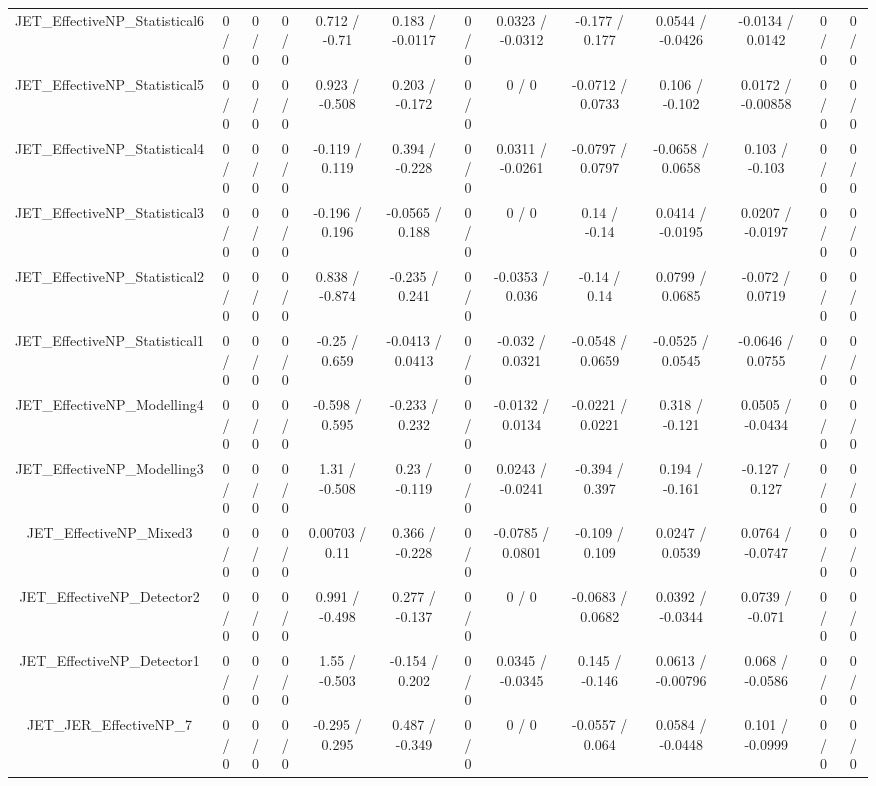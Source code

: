 \documentclass[10pt]{article}
\begin{document}
\begin{table}[htbp]
\begin{center}
\begin{tabular}{|c|c|c|c|c|c|c|c|c|c|c|c|c|}
  JET_EffectiveNP_Statistical6 & 0 / 0 & 0 / 0 & 0 / 0 & 0.712 / -0.71 & 0.183 / -0.0117 & 0 / 0 & 0.0323 / -0.0312 & -0.177 / 0.177 & 0.0544 / -0.0426 & -0.0134 / 0.0142 & 0 / 0 & 0 / 0 \\ 
  JET_EffectiveNP_Statistical5 & 0 / 0 & 0 / 0 & 0 / 0 & 0.923 / -0.508 & 0.203 / -0.172 & 0 / 0 & 0 / 0 & -0.0712 / 0.0733 & 0.106 / -0.102 & 0.0172 / -0.00858 & 0 / 0 & 0 / 0 \\ 
  JET_EffectiveNP_Statistical4 & 0 / 0 & 0 / 0 & 0 / 0 & -0.119 / 0.119 & 0.394 / -0.228 & 0 / 0 & 0.0311 / -0.0261 & -0.0797 / 0.0797 & -0.0658 / 0.0658 & 0.103 / -0.103 & 0 / 0 & 0 / 0 \\ 
  JET_EffectiveNP_Statistical3 & 0 / 0 & 0 / 0 & 0 / 0 & -0.196 / 0.196 & -0.0565 / 0.188 & 0 / 0 & 0 / 0 & 0.14 / -0.14 & 0.0414 / -0.0195 & 0.0207 / -0.0197 & 0 / 0 & 0 / 0 \\ 
  JET_EffectiveNP_Statistical2 & 0 / 0 & 0 / 0 & 0 / 0 & 0.838 / -0.874 & -0.235 / 0.241 & 0 / 0 & -0.0353 / 0.036 & -0.14 / 0.14 & 0.0799 / 0.0685 & -0.072 / 0.0719 & 0 / 0 & 0 / 0 \\ 
  JET_EffectiveNP_Statistical1 & 0 / 0 & 0 / 0 & 0 / 0 & -0.25 / 0.659 & -0.0413 / 0.0413 & 0 / 0 & -0.032 / 0.0321 & -0.0548 / 0.0659 & -0.0525 / 0.0545 & -0.0646 / 0.0755 & 0 / 0 & 0 / 0 \\ 
  JET_EffectiveNP_Modelling4 & 0 / 0 & 0 / 0 & 0 / 0 & -0.598 / 0.595 & -0.233 / 0.232 & 0 / 0 & -0.0132 / 0.0134 & -0.0221 / 0.0221 & 0.318 / -0.121 & 0.0505 / -0.0434 & 0 / 0 & 0 / 0 \\ 
  JET_EffectiveNP_Modelling3 & 0 / 0 & 0 / 0 & 0 / 0 & 1.31 / -0.508 & 0.23 / -0.119 & 0 / 0 & 0.0243 / -0.0241 & -0.394 / 0.397 & 0.194 / -0.161 & -0.127 / 0.127 & 0 / 0 & 0 / 0 \\ 
  JET_EffectiveNP_Mixed3 & 0 / 0 & 0 / 0 & 0 / 0 & 0.00703 / 0.11 & 0.366 / -0.228 & 0 / 0 & -0.0785 / 0.0801 & -0.109 / 0.109 & 0.0247 / 0.0539 & 0.0764 / -0.0747 & 0 / 0 & 0 / 0 \\ 
  JET_EffectiveNP_Detector2 & 0 / 0 & 0 / 0 & 0 / 0 & 0.991 / -0.498 & 0.277 / -0.137 & 0 / 0 & 0 / 0 & -0.0683 / 0.0682 & 0.0392 / -0.0344 & 0.0739 / -0.071 & 0 / 0 & 0 / 0 \\ 
  JET_EffectiveNP_Detector1 & 0 / 0 & 0 / 0 & 0 / 0 & 1.55 / -0.503 & -0.154 / 0.202 & 0 / 0 & 0.0345 / -0.0345 & 0.145 / -0.146 & 0.0613 / -0.00796 & 0.068 / -0.0586 & 0 / 0 & 0 / 0 \\ 
  JET_JER_EffectiveNP_7 & 0 / 0 & 0 / 0 & 0 / 0 & -0.295 / 0.295 & 0.487 / -0.349 & 0 / 0 & 0 / 0 & -0.0557 / 0.064 & 0.0584 / -0.0448 & 0.101 / -0.0999 & 0 / 0 & 0 / 0 \\ 

\end{tabular}
\end{center}
\end{table}
\end{document}
